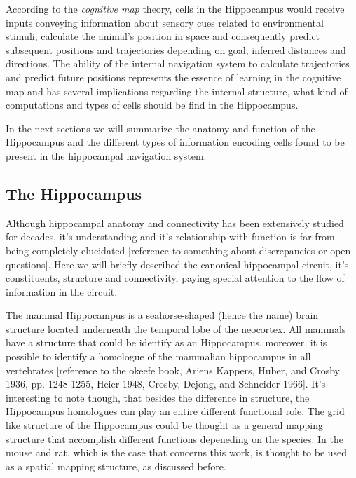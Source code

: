According to the \textit{cognitive map} theory, cells in the Hippocampus would receive inputs conveying information about sensory cues related to environmental stimuli, calculate the animal's position in space and consequently predict subsequent positions and trajectories depending on goal, inferred distances and directions. 
The ability of the internal navigation system to calculate trajectories and predict future positions represents the essence of learning in the cognitive map and has several implications regarding the internal structure, what kind of computations and types of cells should be find in the Hippocampus.

In the next sections we will summarize the anatomy and function of the Hippocampus and the different types of information encoding cells found to be present in the hippocampal navigation system.

\subsection{The Hippocampus}
\label{chap1:sec:1:subsec1:hippocampus}
Although hippocampal anatomy and connectivity has been extensively studied for decades, it's understanding and it's relationship with function is far from being completely elucidated [reference to something about discrepancies or open questions]. 
Here we will briefly described the canonical hippocampal circuit, it's constituents, structure and connectivity, paying special attention to the flow of information in the circuit.

The mammal Hippocampus is a seahorse-shaped (hence the name) brain structure located underneath the temporal lobe of the neocortex.
All mammals have a structure that could be identify as an Hippocampus, moreover, it is possible to identify a homologue of the mammalian hippocampus in all vertebrates [reference to the okeefe book, Ariens Kappers, Huber, and Crosby 1936, pp. 1248-1255, Heier 1948, Crosby, Dejong, and Schneider 1966].
It's interesting to note though, that besides the difference in structure, the Hippocampus homologues can play an entire different functional role.
The grid like structure of the Hippocampus could be thought as a general mapping structure that accomplish different functions depeneding on the species. 
In the mouse and rat, which is the case that concerns this work, is thought to be used as a spatial mapping structure, as discussed before.

